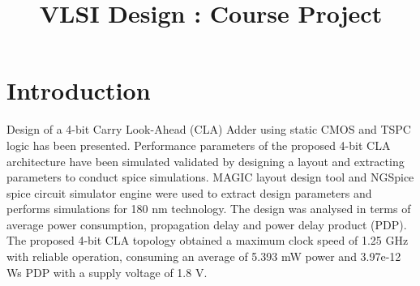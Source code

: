 \documentclass[conference]{IEEEtran}
\begin{document}
\title{VLSI Design : Course Project}

\author{
}


\maketitle

\section{Introduction}
Design of a 4-bit Carry Look-Ahead (CLA) Adder using static CMOS and TSPC logic has been presented. Performance parameters of the proposed 4-bit CLA architecture have been simulated validated by designing a layout and extracting parameters to conduct spice simulations. MAGIC layout design tool and NGSpice spice circuit simulator engine were used to extract design parameters and performs simulations for 180 nm technology. The design was analysed in terms of average power consumption, propagation delay and power delay product (PDP). The proposed 4-bit CLA topology obtained a maximum clock speed of 1.25 GHz with reliable operation, consuming an average of 5.393 mW power and 3.97e-12 Ws PDP with a supply voltage of 1.8 V.
\end{document}
